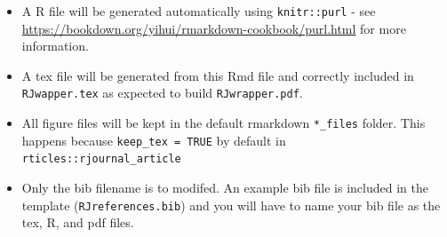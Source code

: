 \begin{itemize}
\tightlist
\item
  A R file will be generated automatically using \texttt{knitr::purl} -
  see \url{https://bookdown.org/yihui/rmarkdown-cookbook/purl.html} for
  more information.
\item
  A tex file will be generated from this Rmd file and correctly included
  in \texttt{RJwapper.tex} as expected to build \texttt{RJwrapper.pdf}.
\item
  All figure files will be kept in the default rmarkdown
  \texttt{*\_files} folder. This happens because
  \texttt{keep\_tex\ =\ TRUE} by default in
  \texttt{rticles::rjournal\_article}
\item
  Only the bib filename is to modifed. An example bib file is included
  in the template (\texttt{RJreferences.bib}) and you will have to name
  your bib file as the tex, R, and pdf files.
\end{itemize}



\address{%
Maciej Beręsewicz\\
Poznań University of Economics and Business\\%
Al. Niepodległości 10\\ 61-875 Poznań, Poland\\
Statistical Office in Poznań\\%
ul. Wojska Polskiego 27/29\\ 60-624 Poznań, Poland\\
%
\url{https://ncn-foreigners.github.io/}\\%
\textit{ORCiD: \href{https://orcid.org/0000-0002-8281-4301}{0000-0002-8281-4301}}\\%
\href{mailto:maciej.beresewicz@ue.poznan.pl}{\nolinkurl{maciej.beresewicz@ue.poznan.pl}}%
}

\address{%
Piotr Chlebicki\\
Adam Mickiewicz University\\%
ul. Wieniawskiego 1\\ 61-712 Poznań, Poland\\
%
\url{https://github.com/Kertoo}\\%
%
\href{mailto:piochl@st.amu.edu.pl}{\nolinkurl{piochl@st.amu.edu.pl}}%
}
